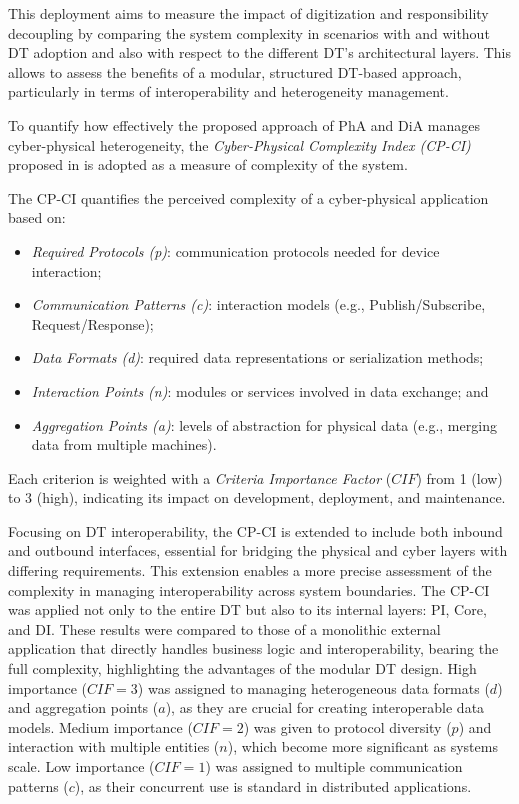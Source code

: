 This deployment aims to measure the impact of digitization and responsibility decoupling by comparing the system complexity in scenarios with and without \ac{DT} adoption and also with respect to the different \ac{DT}'s architectural layers.
%
This allows to assess the benefits of a modular, structured DT-based approach, particularly in terms of interoperability and heterogeneity management.

To quantify how effectively the proposed approach of \ac{PhA} and \ac{DiA} manages cyber-physical heterogeneity,
the \textit{Cyber-Physical Complexity Index (CP-CI)} proposed in \cite{lippi_dt_causality_learning, LOMBARDO2024107203} is adopted as a measure of complexity of the system. 

The CP-CI quantifies the perceived complexity of a cyber-physical application based on:
\begin{itemize}
    \item \textit{Required Protocols (p)}: communication protocols needed for device interaction;
    \item \textit{Communication Patterns (c)}: interaction models (e.g., Publish/Subscribe, Request/Response);
    \item \textit{Data Formats (d)}: required data representations or serialization methods;
    \item \textit{Interaction Points (n)}: modules or services involved in data exchange; and
    \item \textit{Aggregation Points (a)}: levels of abstraction for physical data (e.g., merging data from multiple machines).
\end{itemize}
Each criterion is weighted with a \textit{Criteria Importance Factor} (\(CIF\)) from 1 (low) to 3 (high), indicating its impact on development, deployment, and maintenance.

Focusing on \ac{DT} interoperability, the CP-CI is extended to include both inbound and outbound interfaces, essential for bridging the physical and cyber layers with differing requirements.
This extension enables a more precise assessment of the complexity in managing interoperability across system boundaries.
The CP-CI was applied not only to the entire \ac{DT} but also to its internal layers: \ac{PI}, Core, and \ac{DI}.
These results were compared to those of a monolithic external application that directly handles business logic and interoperability, bearing the full complexity, highlighting the advantages of the modular \ac{DT} design.
High importance ($CIF=3$) was assigned to managing heterogeneous data formats ($d$) and aggregation points ($a$), as they are crucial for creating interoperable data models.
Medium importance ($CIF=2$) was given to protocol diversity ($p$) and interaction with multiple entities ($n$), which become more significant as systems scale.
Low importance ($CIF=1$) was assigned to multiple communication patterns ($c$), as their concurrent use is standard in distributed applications.


